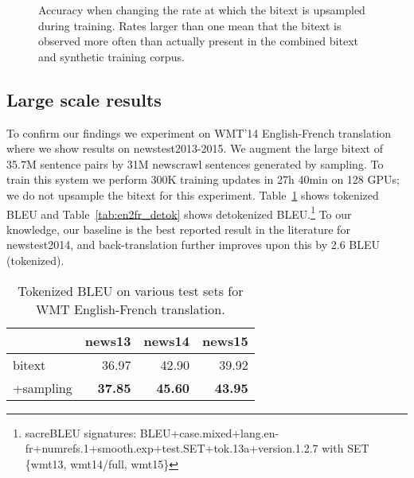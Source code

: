 \documentclass[11pt,a4paper]{article}
\begin{document}
\begin{figure}[t]
\begin{center}
\caption{Accuracy when changing the rate at which the bitext is upsampled during training. Rates larger than one mean that the bitext is observed more often than actually present in the combined bitext and synthetic training corpus.
\label{fig:upsample}}
\end{center}
\end{figure}



\subsection{Large scale results}
\label{sec:largescale}

To confirm our findings we experiment on WMT'14 English-French translation where we show results on newstest2013-2015. 
We augment the large bitext of 35.7M sentence pairs by 31M newscrawl sentences generated by sampling. 
To train this system we perform 300K training updates in 27h 40min on 128 GPUs; we do not upsample the bitext for this experiment.
Table~\ref{tab:en2fr} shows tokenized BLEU and Table~\ref{tab:en2fr_detok} shows detokenized BLEU.\footnote{sacreBLEU signatures: BLEU+case.mixed+lang.en-fr+numrefs.1+smooth.exp+test.SET+tok.13a+version.1.2.7 with SET  \{wmt13, wmt14/full, wmt15\}}
To our knowledge, our baseline is the best reported result in the literature for newstest2014, and back-translation further improves upon this by 2.6 BLEU (tokenized).

\begin{table}[t]
\centering
\begin{tabular}{lrrr}
\toprule
& \bf news13 & \bf news14 & \bf news15 \\ \midrule
bitext    & 36.97 & 42.90 & 39.92 \\
+sampling & {\bf 37.85} & {\bf 45.60} & {\bf 43.95} \\
\bottomrule
\end{tabular}
\caption{Tokenized BLEU on various test sets for WMT English-French translation.
}
\label{tab:en2fr}
\end{table}
\end{document}
